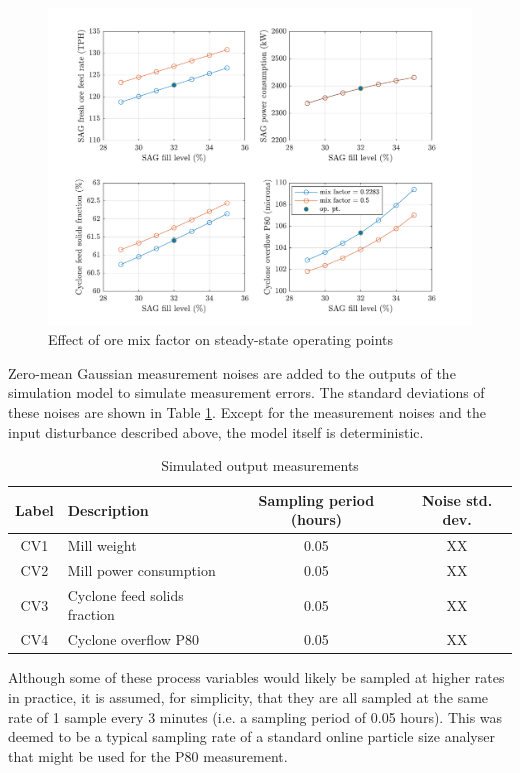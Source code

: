 {\begin{figure}[htp]
	\centering
	\includegraphics[width=15cm]{images/grind_sim_ss_plot2.pdf}
	\caption{Effect of ore mix factor on steady-state operating points}
	\label{fig:grind_sim_ss_plot2}
\end{figure}

Zero-mean Gaussian measurement noises are added to the outputs of the simulation model to simulate measurement errors. The standard deviations of these noises are shown in Table \ref{tb:meas-noise}. Except for the measurement noises and the input disturbance described above, the model itself is deterministic.


\begin{table}[h!]
	\centering
	\caption{Simulated output measurements} \label{tb:meas-noise}
	\begin{tabular}{c >{\raggedright}p{5.5cm} c c}
		Label & Description & Sampling period (hours) & Noise std. dev. \\
		\midrule
		CV1        & Mill weight & 0.05 & XX \\ 
		CV2       & Mill power consumption & 0.05 & XX \\ 
		CV3       & Cyclone feed solids fraction & 0.05 & XX \\ 
		CV4       & Cyclone overflow P80 & 0.05 & XX \\ 
		\bottomrule
	\end{tabular}
\end{table}


Although some of these process variables would likely be sampled at higher rates in practice, it is assumed, for simplicity, that they are all sampled at the same rate of 1 sample every 3 minutes (i.e. a sampling period of 0.05 hours). This was deemed to be a typical sampling rate of a standard online particle size analyser that might be used for the P80 measurement.


}
